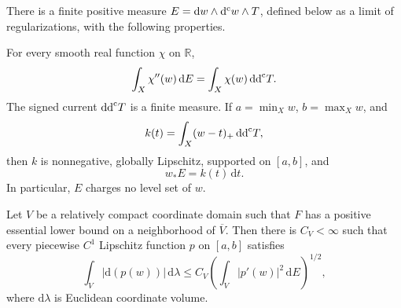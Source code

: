 \begin{proposition}\label{prop:weak-level-energy}
There is a finite positive measure $E=\mathrm{d} w\wedge\mathrm d^{\mathrm c} w\wedge T$, defined below as a limit of regularizations, with the following properties.

For every smooth real function $\chi$ on $\mathbb R$,
\begin{equation}\label{eq:weak-energy-chain}
\int_X\chi''(w)\,\mathrm{d} E=\int_X\chi(w)\,\mathrm{dd}^{\mathrm{c}} T.
\end{equation}
The signed current $\mathrm{dd}^{\mathrm{c}} T$ is a finite measure. If $a=\min_Xw$, $b=\max_Xw$, and
\[
k(t)=\int_X(w-t)_+\,\mathrm{dd}^{\mathrm{c}} T,
\]
then $k$ is nonnegative, globally Lipschitz, supported on $[a,b]$, and
\begin{equation}\label{eq:weak-energy-pushforward}
w_*E=k(t)\,\mathrm{d} t.
\end{equation}
In particular, $E$ charges no level set of $w$.

Let $V$ be a relatively compact coordinate domain such that $F$ has a positive essential lower bound on a neighborhood of $\overline V$. Then there is $C_V<\infty$ such that every piecewise $C^1$ Lipschitz function $p$ on $[a,b]$ satisfies
\begin{equation}\label{eq:weak-local-coercivity}
\int_V|\mathrm{d}(p(w))|\,\mathrm{d}\lambda\leq C_V\left(\int_V|p'(w)|^2\,\mathrm{d} E\right)^{1/2},
\end{equation}
where $\mathrm{d}\lambda$ is Euclidean coordinate volume.
\end{proposition}

